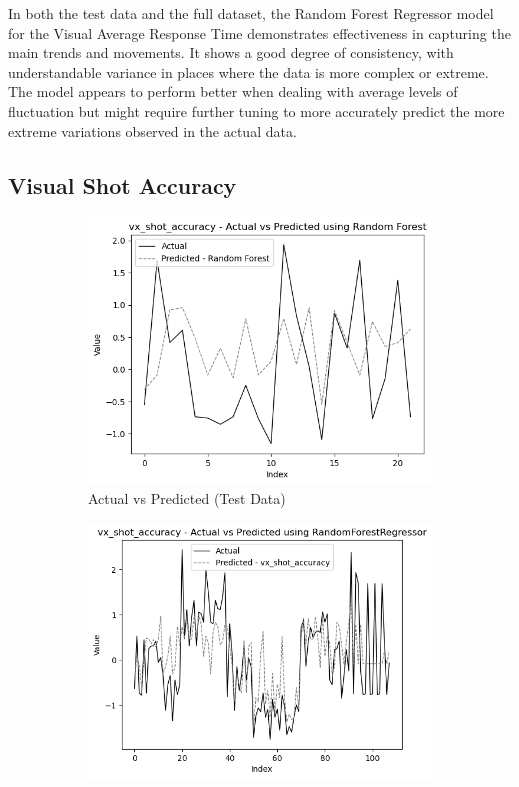In both the test data and the full dataset, the Random Forest Regressor model for the Visual Average Response Time demonstrates effectiveness in capturing the main trends and movements.
It shows a good degree of consistency, with understandable variance in places where the data is more complex or extreme. The model appears to perform better when dealing with average levels of 
fluctuation but might require further tuning to more accurately predict the more extreme variations observed in the actual data.


\subsection*{Visual Shot Accuracy}

\begin{figure}[htbp]
    \centering
    \begin{subfigure}[b]{0.49\textwidth}
        \centering
        \includegraphics[width=\textwidth]{images/regressionCharts/test_data_visual_shot_accuracy.png}
        \caption{Actual vs Predicted (Test Data)}
        \label{fig:actual_vs_predicted_vx_shot_accuracy_test}
    \end{subfigure}\hfill
    \begin{subfigure}[b]{0.49\textwidth}
        \centering
        \includegraphics[width=\textwidth]{images/regressionCharts/all_data_visual_shot_accuracy.png}

\end{subfigure}
\end{figure}

